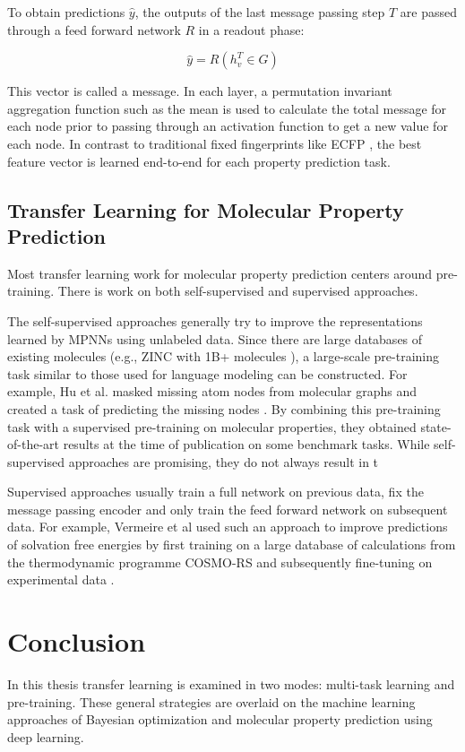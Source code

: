 To obtain predictions $\hat y$, the outputs of the last message passing step $T$ are passed through a feed forward network $R$ in a readout phase:

\begin{equation}
    \hat y = R(h_v^T \in G)
\end{equation}

This  vector is called a message. In each layer, a permutation invariant aggregation function such as the mean is used to calculate the total message for each node prior to passing through an activation function to get a new value for each node.  In contrast to traditional fixed fingerprints like ECFP \cite{Rogers2010}, the best feature vector is learned end-to-end for each property prediction task.

\subsection{Transfer Learning for Molecular Property Prediction}

Most transfer learning work for molecular property prediction centers around pre-training. There is work on both self-supervised and supervised approaches.

The self-supervised approaches generally try to improve the representations learned by MPNNs using unlabeled data. Since there are large databases of existing molecules (e.g., ZINC with 1B+ molecules \cite{Irwin2020}), a large-scale pre-training task similar to those used for language modeling can be constructed. For example, Hu et al. masked missing atom nodes from molecular graphs and created a task of predicting the missing nodes \cite{Hu2020Pretrain}. By combining this pre-training task with a supervised pre-training on molecular properties, they obtained state-of-the-art results at the time of publication on some benchmark tasks. While self-supervised approaches are promising, they do not always result in t

Supervised approaches usually train a full network on previous data, fix the message passing encoder and only train the feed forward network on subsequent data. For example, Vermeire et al used such an approach to improve predictions of solvation free energies by first training on a large database of calculations from the thermodynamic programme COSMO-RS and subsequently fine-tuning on experimental data \cite{Vermeire2021}. 

\section{Conclusion}

In this thesis transfer learning is examined in two modes: multi-task learning and pre-training. These general strategies are overlaid on the machine learning approaches of Bayesian optimization and molecular property prediction using deep learning. 